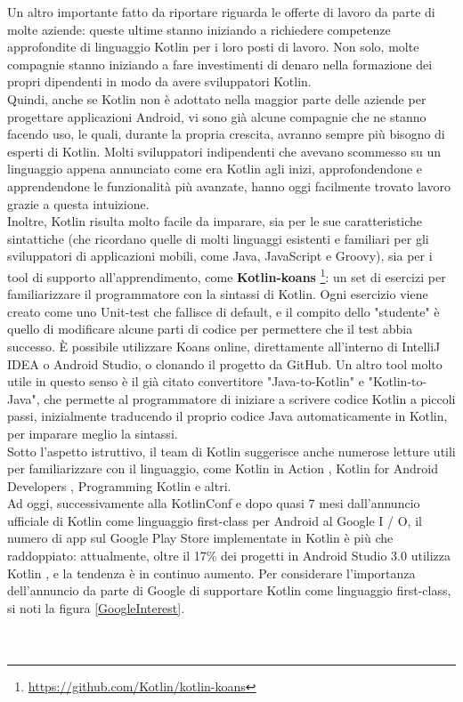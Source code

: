 Un altro importante fatto da riportare riguarda le offerte di lavoro da parte di molte aziende: queste ultime stanno iniziando a richiedere competenze approfondite di linguaggio Kotlin per i loro posti di lavoro. Non solo, molte compagnie stanno iniziando a fare investimenti di denaro nella formazione dei propri dipendenti in modo da avere sviluppatori Kotlin.\\
Quindi, anche se Kotlin non è adottato nella maggior parte delle aziende per progettare applicazioni Android, vi sono già alcune compagnie che ne stanno facendo uso, le quali, durante la propria crescita, avranno sempre più bisogno di esperti di Kotlin. Molti sviluppatori indipendenti che avevano scommesso su un linguaggio appena annunciato come era Kotlin agli inizi, approfondendone e apprendendone le funzionalità più avanzate, hanno oggi facilmente trovato lavoro grazie a questa intuizione.\\

Inoltre, Kotlin risulta molto facile da imparare, sia per le sue caratteristiche sintattiche (che ricordano quelle di molti linguaggi esistenti e familiari per gli sviluppatori di applicazioni mobili, come Java, JavaScript e Groovy), sia per i tool di supporto all'apprendimento, come {\bfseries Kotlin-koans} \footnote{\url{https://github.com/Kotlin/kotlin-koans}}: un set di esercizi per familiarizzare il programmatore con la sintassi di Kotlin. Ogni esercizio viene creato come uno Unit-test che fallisce di default, e il compito dello "studente" è quello di modificare alcune parti di codice per permettere che il test abbia successo. È possibile utilizzare Koans online, direttamente all'interno di IntelliJ IDEA o Android Studio, o clonando il progetto da GitHub. Un altro tool molto utile in questo senso è il già citato convertitore "Java-to-Kotlin" e "Kotlin-to-Java", che permette al programmatore di iniziare a scrivere codice Kotlin a piccoli passi, inizialmente traducendo il proprio codice Java automaticamente in Kotlin, per imparare meglio la sintassi.\\
Sotto l'aspetto istruttivo, il team di Kotlin suggerisce anche numerose letture utili per familiarizzare con il linguaggio, come
Kotlin in Action \cite{kaction}, Kotlin for Android Developers \cite{leiva}, Programming Kotlin \cite{programmingKotlin} e altri.\\

Ad oggi, successivamente alla KotlinConf e dopo quasi 7 mesi dall'annuncio ufficiale di Kotlin come linguaggio first-class per Android al Google I / O, il numero di app sul Google Play Store implementate in Kotlin è più che raddoppiato: attualmente, oltre il 17\% dei progetti in Android Studio 3.0 utilizza Kotlin \cite{ktUpdateAndroidDevBlog}, e la tendenza è in continuo aumento. Per considerare l'importanza dell'annuncio da parte di Google di supportare Kotlin come linguaggio first-class, si noti la figura \ref{GoogleInterest}.\\
\\
\\

